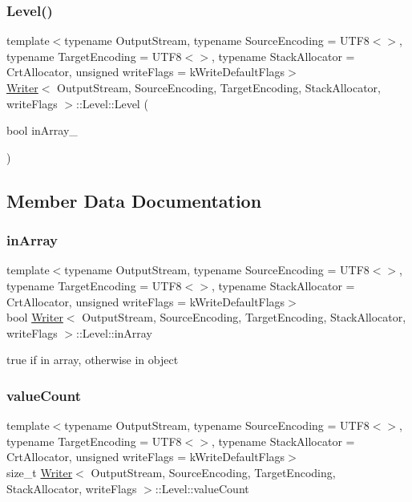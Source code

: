 \subsubsection{\texorpdfstring{Level()}{Level()}}
{\footnotesize\ttfamily template$<$typename Output\+Stream, typename Source\+Encoding = U\+T\+F8$<$$>$, typename Target\+Encoding = U\+T\+F8$<$$>$, typename Stack\+Allocator = Crt\+Allocator, unsigned write\+Flags = k\+Write\+Default\+Flags$>$ \\
\hyperlink{classWriter}{Writer}$<$ Output\+Stream, Source\+Encoding, Target\+Encoding, Stack\+Allocator, write\+Flags $>$\+::Level\+::\+Level (\begin{DoxyParamCaption}\item[{bool}]{in\+Array\+\_\+ }\end{DoxyParamCaption})\hspace{0.3cm}{\ttfamily [inline]}}



\subsection{Member Data Documentation}
\mbox{\label{structWriter_1_1Level_aa009a2d675e98757c2997072aad78789}} 
\subsubsection{\texorpdfstring{in\+Array}{inArray}}
{\footnotesize\ttfamily template$<$typename Output\+Stream, typename Source\+Encoding = U\+T\+F8$<$$>$, typename Target\+Encoding = U\+T\+F8$<$$>$, typename Stack\+Allocator = Crt\+Allocator, unsigned write\+Flags = k\+Write\+Default\+Flags$>$ \\
bool \hyperlink{classWriter}{Writer}$<$ Output\+Stream, Source\+Encoding, Target\+Encoding, Stack\+Allocator, write\+Flags $>$\+::Level\+::in\+Array}



true if in array, otherwise in object 

\mbox{\label{structWriter_1_1Level_a4a09e5fda49d0d57b2adc041203f244f}} 
\subsubsection{\texorpdfstring{value\+Count}{valueCount}}
{\footnotesize\ttfamily template$<$typename Output\+Stream, typename Source\+Encoding = U\+T\+F8$<$$>$, typename Target\+Encoding = U\+T\+F8$<$$>$, typename Stack\+Allocator = Crt\+Allocator, unsigned write\+Flags = k\+Write\+Default\+Flags$>$ \\
size\+\_\+t \hyperlink{classWriter}{Writer}$<$ Output\+Stream, Source\+Encoding, Target\+Encoding, Stack\+Allocator, write\+Flags $>$\+::Level\+::value\+Count}



